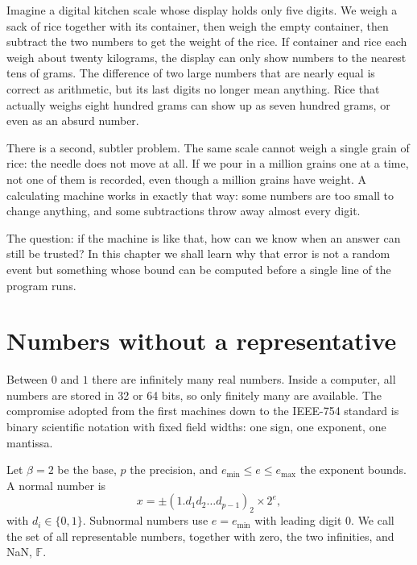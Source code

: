 \begin{untukanak}
Imagine a digital kitchen scale whose display holds only five digits. We weigh a sack
of rice together with its container, then weigh the empty container, then subtract the
two numbers to get the weight of the rice. If container and rice each weigh about
twenty kilograms, the display can only show numbers to the nearest tens of grams. The
difference of two large numbers that are nearly equal is correct as arithmetic, but its
last digits no longer mean anything. Rice that actually weighs eight hundred grams can
show up as seven hundred grams, or even as an absurd number.

There is a second, subtler problem. The same scale cannot weigh a single grain of rice:
the needle does not move at all. If we pour in a million grains one at a time, not one
of them is recorded, even though a million grains have weight. A calculating machine
works in exactly that way: some numbers are too small to change anything, and some
subtractions throw away almost every digit.

The question: if the machine is like that, how can we know when an answer can still be
trusted? In this chapter we shall learn why that error is not a random event but
something whose bound can be computed before a single line of the program runs.
\end{untukanak}

\section{Numbers without a representative}

Between $0$ and $1$ there are infinitely many real numbers. Inside a computer, all
numbers are stored in 32 or 64 bits, so only finitely many are available. The
compromise adopted from the first machines down to the IEEE-754 standard is binary
scientific notation with fixed field widths: one sign, one exponent, one mantissa.


\begin{definisi}
Let $\beta=2$ be the base, $p$ the precision, and $e_{\min}\le e\le e_{\max}$ the
exponent bounds. A normal number is
\[
  x=\pm\left(1.d_{1}d_{2}\dots d_{p-1}\right)_{2}\times2^{e},
\]
with $d_{i}\in\{0,1\}$. Subnormal numbers use $e=e_{\min}$ with leading digit
$0$. We call the set of all
representable numbers, together with zero, the two infinities, and NaN,
$\mathbb{F}$.
\end{definisi}

